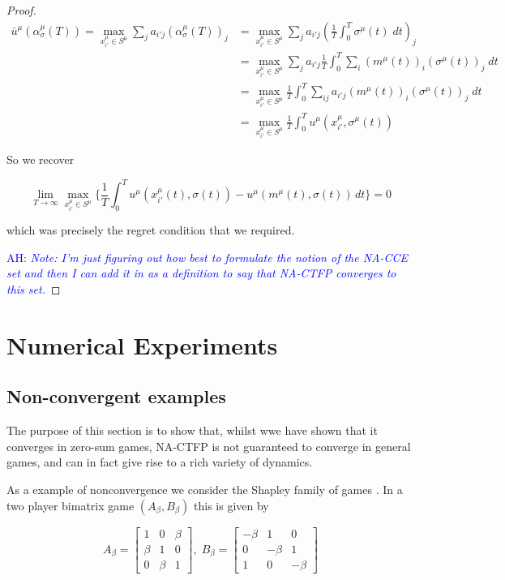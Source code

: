 \documentclass{article}
\theoremstyle{definition}
\newcommand{\ah}[1]{\textcolor{blue}{AH: \textit{#1}}}
\begin{document}
\begin{proof}
		\begin{align}
			\bar{u}^\mu (\alpha_\sigma^\mu (T)) = \max_{x^\mu_{i'} \in S^\mu} \sum_{j} a_{i'j} (\alpha_{\sigma}^\mu (T))_j & = \max_{x^\mu_{i'} \in S^\mu} \sum_{j} a_{i'j} (\frac{1}{T} \int_{0}^{T} \sigma^\mu(t) \; dt)_j \\
			& = \max_{x^\mu_{i'} \in S^\mu} \sum_{j} a_{i'j} \frac{1}{T} \int_{0}^{T} \sum_i (m^\mu (t))_i (\sigma^\mu(t))_j \; dt\\
			& = \max_{x^\mu_{i'} \in S^\mu} \frac{1}{T} \int_0^T \sum_{ij} a_{i'j} (m^\mu (t))_i (\sigma^\mu(t))_j \; dt\\
			& = \max_{x^\mu_{i'} \in S^\mu} \frac{1}{T} \int_0^T u^\mu(x^\mu_{i'}, \sigma^\mu(t))
		\end{align}

		So we recover

		\begin{equation}
			\lim_{T \rightarrow \infty} \max_{x_{i'}^\mu \in S^\mu} \Big\{ \frac{1}{T} \int_{0}^{T} u^{\mu}(x_{i'}^\mu(t), \sigma(t)) - u^{\mu}(m^\mu(t), \sigma(t)) \, dt \Big\} = 0
		\end{equation}

		which was precisely the regret condition that we required.

		\ah{Note: I'm just figuring out how best to formulate the notion of the NA-CCE set and then I can add it in as a definition to say that NA-CTFP converges to this set.}
	\end{proof}


	\section{Numerical Experiments}

	\subsection{Non-convergent examples}
	The purpose of this section is to show that, whilst wwe have shown that it converges in zero-sum games, NA-CTFP is not guaranteed to converge in general games, and can in fact give rise to a rich variety of dynamics.

	
	
	As a example of nonconvergence we consider the Shapley family of games \cite{}. In a two player bimatrix game $(A_\beta, B_\beta)$ this is given by

	\begin{equation}
		A_\beta = \begin{bmatrix}
			1 & 0 & \beta \\
			\beta & 1 & 0 \\
			0 & \beta & 1
		\end{bmatrix}, \; B_\beta =  \begin{bmatrix}
			- \beta & 1 & 0 \\
			0 & -\beta & 1 \\
			1 & 0 & -\beta
		\end{bmatrix}
	\end{equation}
\end{document}
